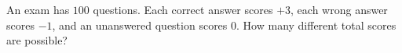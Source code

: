 An exam has $100$ questions. Each correct answer scores $+3$, each wrong answer scores $-1$, and an unanswered question scores $0$. How many different total scores are possible?
